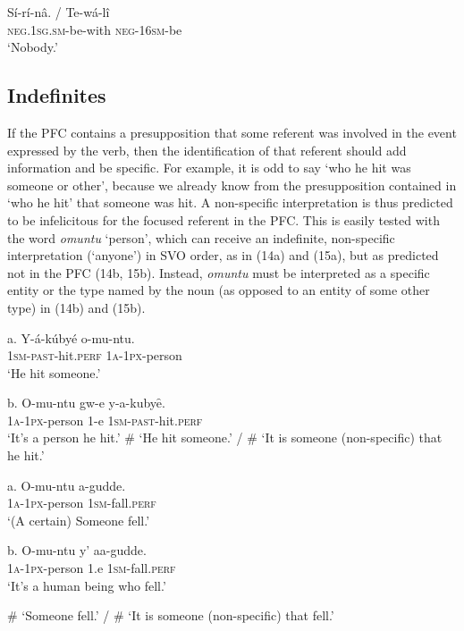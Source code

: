 \documentclass[output=paper]{langsci/langscibook}
\begin{document}
\ea
\gll Sí-rí-nâ.      /   Te-wá-lî\\
     \textsc{neg.1sg.sm}-be-with    \textsc{neg-16sm}-be\\
\glt ‘Nobody.’
\z

\subsection{Indefinites} %

If the PFC contains a presupposition that some referent was involved in the event expressed by the verb, then the identification of that referent should add information and be specific. For example, it is odd to say ‘who he hit was someone or other’, because we already know from the presupposition contained in ‘who he hit’ that someone was hit. A non-specific interpretation is thus predicted to be infelicitous for the focused referent in the PFC. This is easily tested with the word \textit{omuntu} ‘person’, which can receive an indefinite, non-specific interpretation (‘anyone’) in SVO order, as in (14a) and (15a), but as predicted not in the PFC (14b, 15b). Instead, \textit{omuntu} must be interpreted as a specific entity or the type named by the noun (as opposed to an entity of some other type) in (14b) and (15b).

\ea
\gll   a.  Y-á-kúbyé    o-mu-ntu.\\
         \textsc{1sm-past}-hit.\textsc{perf}  \textsc{1a-1px}-person\\
\glt     ‘He hit someone.’
\z

\ea
\gll   b.  O-mu-ntu    gw-e  y-a-kubyȇ.\\
         \textsc{1a-1px}-person  1-e  \textsc{1sm-past}-hit.\textsc{perf}\\
\glt     ‘It’s a person he hit.’ 
\glt     \# ‘He hit someone.’ / \# ‘It is someone (non-specific) that he hit.’
\z

\ea
\gll   a.  O-mu-ntu    a-gudde.\\
         \textsc{1a-1px}-person  1\textsc{sm}-fall.\textsc{perf}\\
\glt     ‘(A certain) Someone fell.’
\z

\ea
\gll   b.  O-mu-ntu    y’  aa-gudde.\\
         \textsc{1a-1px}-person  1.e  \textsc{1sm}-fall.\textsc{perf}\\
\glt     ‘It’s a human being who fell.’

\glt     \# ‘Someone fell.’ / \# ‘It is someone (non-specific) that fell.’
\z
\end{document}
